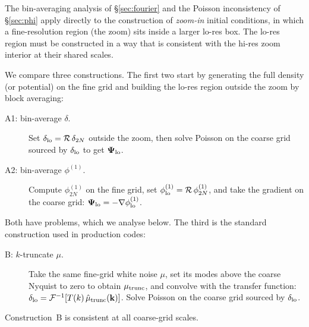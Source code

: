\documentclass[12pt]{article}
\newcommand{\R}{\mathcal{R}}
\begin{document}
The bin-averaging analysis of \S\ref{sec:fourier} and the Poisson
inconsistency of \S\ref{sec:phi} apply directly to the construction of
\emph{zoom-in} initial conditions, in which a fine-resolution region
(the zoom) sits inside a larger lo-res box. The lo-res region must be
constructed in a way that is consistent with the hi-res zoom interior
at their shared scales.

We compare three constructions. The first two start by generating the
full density (or potential) on the fine grid and building the lo-res
region outside the zoom by block averaging:
\begin{description}
\item[A1: bin-average $\delta$.]
  Set $\delta_{\rm lo} = \R\,\delta_{2N}$ outside the zoom, then solve
  Poisson on the coarse grid sourced by $\delta_{\rm lo}$ to get
  $\boldsymbol{\Psi}_{\rm lo}$.
\item[A2: bin-average $\phi^{(1)}$.]
  Compute $\phi^{(1)}_{2N}$ on the fine grid, set
  $\phi^{(1)}_{\rm lo} = \R\,\phi^{(1)}_{2N}$, and take the gradient on
  the coarse grid:
  $\boldsymbol{\Psi}_{\rm lo} = -\nabla\phi^{(1)}_{\rm lo}$.
\end{description}
Both have problems, which we analyse below. The third is the standard
construction used in production codes:
\begin{description}
\item[B: $k$-truncate $\mu$.]
  Take the same fine-grid white noise $\mu$, set its modes above the
  coarse Nyquist to zero to obtain $\mu_{\rm trunc}$, and convolve
  with the transfer function:
  $\delta_{\rm lo} = \mathcal F^{-1}[T(k)\,\hat\mu_{\rm trunc}(\mathbf k)]$.
  Solve Poisson on the coarse grid sourced by $\delta_{\rm lo}$.
\end{description}
Construction~B is consistent at all coarse-grid scales.
\end{document}
